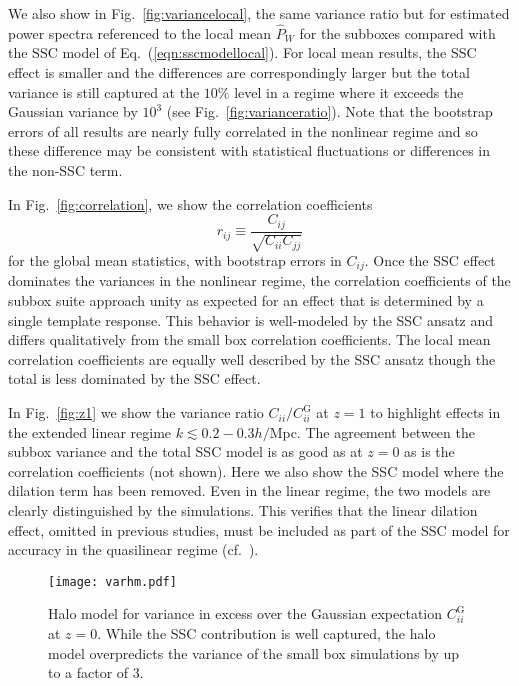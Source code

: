 \documentclass[prd,twocolumn,amsmath,amssymb,floatfix,superscriptaddress]{revtex4-1}
\begin{document}
We also show in Fig.~\ref{fig:variancelocal}, the same variance ratio but for estimated
power spectra referenced to the local mean $\hat P_W$ for the subboxes compared with 
the SSC model of Eq.~(\ref{eqn:sscmodellocal}).  
 For local mean results, the SSC effect is smaller and the
differences are  correspondingly larger but the total variance is still captured at the
$10\%$ level in a regime where it exceeds the Gaussian variance by $10^3$ (see Fig.~\ref{fig:varianceratio}).    Note that the bootstrap errors of all results are nearly fully correlated
in the nonlinear regime and so these difference may be consistent with statistical fluctuations
or differences in the non-SSC term.





In Fig.~\ref{fig:correlation}, we show the correlation coefficients 
\begin{equation}
r_{ij} \equiv \frac{C_{ij}}{\sqrt{C_{ii}C_{jj}}}
\end{equation}
for the global mean statistics, with bootstrap errors in {$C_{ij}$}.
Once the SSC effect dominates the variances in the nonlinear regime, the correlation coefficients of the subbox suite approach unity as expected for an effect that is determined by a single
template response.    This behavior is well-modeled by the SSC ansatz and differs qualitatively from the small box correlation coefficients.   The local mean correlation coefficients are equally well described by the SSC ansatz though the total is less
dominated by the SSC effect.   

In Fig.~\ref{fig:z1}
we show the variance ratio $C_{ii}/C^\text{G}_{ii}$ at $z=1$ to highlight effects in the
extended linear regime $k \lesssim 0.2-0.3 h/$Mpc.    The agreement between the subbox 
variance and the total SSC model is as good as at $z=0$ as is the correlation coefficients (not shown).  
Here we  also show the SSC
model where  the dilation term has been removed.    Even in the linear regime, 
the two models are clearly distinguished by the simulations.
This verifies that the linear dilation effect, omitted in previous studies, must be included
as part of the SSC model for accuracy in the quasilinear regime (cf.~\cite{dePutter:2011ah}).

{
\begin{figure}[t]
    \centering
    \texttt{[image: varhm.pdf]}
    \caption{\footnotesize  Halo model for variance in excess over the Gaussian
    expectation $C_{ii}^\text{G}$ at $z=0$.   While the SSC contribution is well captured, the halo model overpredicts the variance of the small box simulations by up to a factor of 3.}
    \label{fig:halomodelcov}
\end{figure}
}
\end{document}
